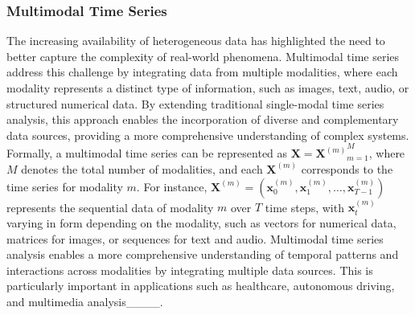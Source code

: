 \subsubsection{Multimodal Time Series}
The increasing availability of heterogeneous data has highlighted the need to better capture the complexity of real-world phenomena. Multimodal time series address this challenge by integrating data from multiple modalities, where each modality represents a distinct type of information, such as images, text, audio, or structured numerical data. By extending traditional single-modal time series analysis, this approach enables the incorporation of diverse and complementary data sources, providing a more comprehensive understanding of complex systems. Formally, a multimodal time series can be represented as $\mathbf{X} = {\mathbf{X}^{(m)}}_{m=1}^M$, where $M$ denotes the total number of modalities, and each $\mathbf{X}^{(m)}$ corresponds to the time series for modality $m$. For instance, $\mathbf{X}^{(m)} = (\mathbf{x}_0^{(m)}, \mathbf{x}_1^{(m)}, \dots, \mathbf{x}_{T-1}^{(m)})$ represents the sequential data of modality $m$ over $T$ time steps, with $\mathbf{x}_t^{(m)}$ varying in form depending on the modality, such as vectors for numerical data, matrices for images, or sequences for text and audio. Multimodal time series analysis enables a more comprehensive understanding of temporal patterns and interactions across modalities by integrating multiple data sources. This is particularly important in applications such as healthcare, autonomous driving, and multimedia analysis____.

